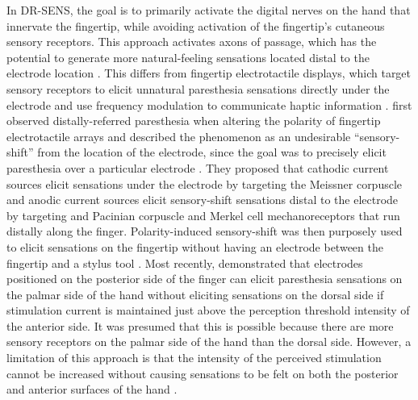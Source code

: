 \documentclass[10pt]{iopart}
\begin{document}
In DR-SENS, the goal is to primarily activate the digital nerves on the hand that innervate the fingertip, while avoiding activation of the fingertip's cutaneous sensory receptors. This approach activates axons of passage, which has the potential to generate more natural-feeling sensations located distal to the electrode location \cite{dalonzo_hyve_2014,geng_evaluation_2012}. This differs from fingertip electrotactile displays, which target sensory receptors to elicit unnatural paresthesia sensations directly under the electrode and use frequency modulation to communicate haptic information \cite{kajimoto_tactile_1999, kitamura_electrotactile_2015}. \citeauthor{kajimoto_tactile_1999} first observed distally-referred paresthesia when altering the polarity of fingertip electrotactile arrays and described the phenomenon as an undesirable ``sensory-shift'' from the location of the electrode, since the goal was to precisely elicit paresthesia over a particular electrode \cite{kajimoto_tactile_1999}. They proposed that cathodic current sources elicit sensations under the electrode by targeting the Meissner corpuscle and anodic current sources elicit sensory-shift sensations distal to the electrode by targeting and Pacinian corpuscle and Merkel cell mechanoreceptors that run distally along the finger. Polarity-induced sensory-shift was then purposely used to elicit sensations on the fingertip without having an electrode between the fingertip and a stylus tool \cite{yoshimoto_development_2011}. Most recently, \citeauthor{tanaka_full-hand_2023} demonstrated that electrodes positioned on the posterior side of the finger can elicit paresthesia sensations on the palmar side of the hand without eliciting sensations on the dorsal side if stimulation current is maintained just above the perception threshold intensity of the anterior side. It was presumed that this is possible because there are more sensory receptors on the palmar side of the hand than the dorsal side. However, a limitation of this approach is that the intensity of the perceived stimulation cannot be increased without causing sensations to be felt on both the posterior and anterior surfaces of the hand \cite{tanaka_full-hand_2023}.
\end{document}
